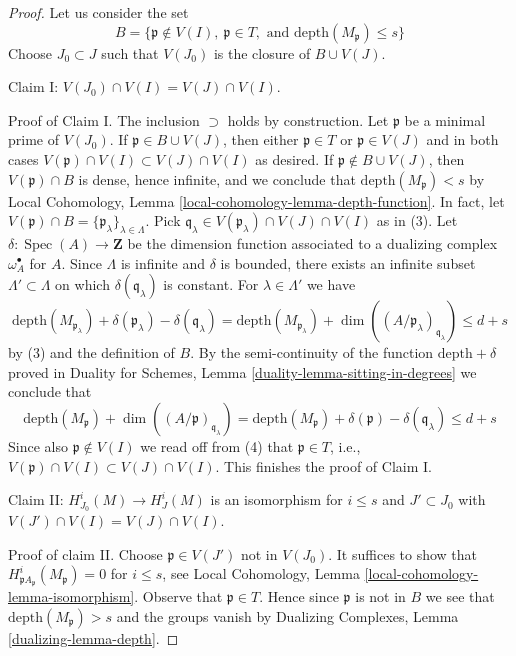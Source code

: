 \documentclass{stacks-project}
\theoremstyle{plain}
\theoremstyle{definition}
\theoremstyle{remark}
\numberwithin{equation}{subsection}
\def\Spec{\mathop{\mathrm{Spec}}}
\begin{document}
\begin{proof}
Let us consider the set
$$
B = \{\mathfrak p \not \in V(I),\ \mathfrak p \in T,\text{ and }
\text{depth}(M_\mathfrak p) \leq s\}
$$
Choose $J_0 \subset J$ such that $V(J_0)$ is the closure of $B \cup V(J)$.

\medskip\noindent
Claim I: $V(J_0) \cap V(I) = V(J) \cap V(I)$.

\medskip\noindent
Proof of Claim I. The inclusion $\supset$ holds by construction.
Let $\mathfrak p$ be a minimal prime of $V(J_0)$.
If $\mathfrak p \in B \cup V(J)$, then either $\mathfrak p \in T$
or $\mathfrak p \in V(J)$ and in both cases
$V(\mathfrak p) \cap V(I) \subset V(J) \cap V(I)$ as desired.
If $\mathfrak p \not \in B \cup V(J)$, then
$V(\mathfrak p) \cap B$ is dense, hence infinite, and we conclude that
$\text{depth}(M_\mathfrak p) < s$ by
Local Cohomology, Lemma \ref{local-cohomology-lemma-depth-function}.
In fact, let
$V(\mathfrak p) \cap B = \{\mathfrak p_\lambda\}_{\lambda \in \Lambda}$.
Pick $\mathfrak q_\lambda \in V(\mathfrak p_\lambda) \cap V(J) \cap V(I)$
as in (3).
Let $\delta : \Spec(A) \to \mathbf{Z}$ be the dimension function
associated to a dualizing complex $\omega_A^\bullet$ for $A$.
Since $\Lambda$ is infinite and $\delta$ is bounded,
there exists an infinite subset $\Lambda' \subset \Lambda$ on which
$\delta(\mathfrak q_\lambda)$ is constant. For
$\lambda \in \Lambda'$ we have
$$
\text{depth}(M_{\mathfrak p_\lambda}) +
\delta(\mathfrak p_\lambda) - \delta(\mathfrak q_\lambda) =
\text{depth}(M_{\mathfrak p_\lambda}) +
\dim((A/\mathfrak p_\lambda)_{\mathfrak q_\lambda})
\leq d + s
$$
by (3) and the definition of $B$. By the semi-continuity of
the function $\text{depth} + \delta$ proved in
Duality for Schemes, Lemma \ref{duality-lemma-sitting-in-degrees}
we conclude that
$$
\text{depth}(M_\mathfrak p) +
\dim((A/\mathfrak p)_{\mathfrak q_\lambda}) =
\text{depth}(M_\mathfrak p) + \delta(\mathfrak p) - \delta(\mathfrak q_\lambda)
\leq d + s
$$
Since also $\mathfrak p \not \in V(I)$ we read off from (4) that
$\mathfrak p \in T$, i.e.,
$V(\mathfrak p) \cap V(I) \subset V(J) \cap V(I)$. This finishes the
proof of Claim I.

\medskip\noindent
Claim II: $H^i_{J_0}(M) \to H^i_J(M)$ is an isomorphism for $i \leq s$
and $J' \subset J_0$ with $V(J') \cap V(I) = V(J) \cap V(I)$.

\medskip\noindent
Proof of claim II. Choose $\mathfrak p \in V(J')$ not in $V(J_0)$.
It suffices to show that $H^i_{\mathfrak pA_\mathfrak p}(M_\mathfrak p) = 0$
for $i \leq s$, see
Local Cohomology, Lemma \ref{local-cohomology-lemma-isomorphism}.
Observe that $\mathfrak p \in T$. Hence since $\mathfrak p$ is not in $B$
we see that $\text{depth}(M_\mathfrak p) > s$ and the groups vanish by
Dualizing Complexes, Lemma \ref{dualizing-lemma-depth}.


\end{proof}
\end{document}
